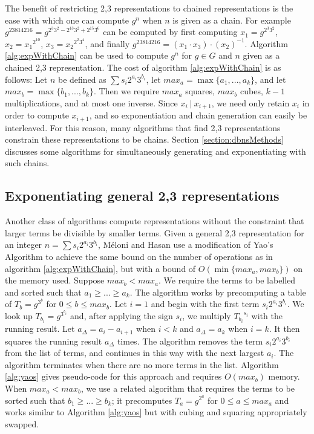 \documentclass{ucalgthes1}
\theoremstyle{definition}
\begin{document}
The benefit of restricting 2,3 representations to chained representations is the ease with which one can compute $g^n$ when $n$ is given as a chain.  For example $g^{23814216} = g^{2^3 3^2 - 2^{13} 3^2 + 2^{15} 3^6}$ can be computed by first computing $x_1 = g^{2^3 3^2}$, $x_2 = {x_1}^{2^{10}}$, $x_3 = {x_2}^{2^2 3^4}$, and finally $g^{23814216} = \left(x_1 \cdot x_3\right) \cdot \left(x_2\right)^{-1}$.  Algorithm \ref{alg:expWithChain} can be used to compute $g^n$ for $g \in G$ and $n$ given as a chained 2,3 representation.  The cost of algorithm \ref{alg:expWithChain} is as follows: Let $n$ be defined as $\sum s_i 2^{a_i} 3^{b_i}$, let $max_a = \max \{a_1,...,a_k\}$, and let $max_b = \max \{b_1,...,b_k\}$.  Then we require $max_a$ squares, $max_b$ cubes, $k-1$ multiplications, and at most one inverse.  Since $x_i ~|~ x_{i+1}$, we need only retain $x_i$ in order to compute $x_{i+1}$, and so exponentiation and chain generation can easily be interleaved. For this reason, many algorithms that find 2,3 representations constrain these representations to be chains.  Section \ref{section:dbnsMethods} discusses some algorithms for simultaneously generating and exponentiating with such chains.



\bigbreak
\subsection{Exponentiating general 2,3 representations}

Another class of algorithms compute representations without the constraint that larger terms be divisible by smaller terms.  Given a general 2,3 representation for an integer $n = \sum s_i 2^{a_i} 3^{b_i}$, M\'{e}loni and Hasan \cite[Section 3.2]{Meloni2009} use a modification of Yao's Algorithm to achieve the same bound on the number of operations as in algorithm \ref{alg:expWithChain}, but with a bound of $O(\min \{max_a, max_b\})$ on the memory used.  Suppose $max_b < max_a$.  We require the terms to be labelled and sorted such that $a_1 \ge ... \ge a_k$.  The algorithm works by precomputing a table of $T_b = g^{3^b}$ for $0 \le b \le max_b$.  Let $i=1$ and begin with the first term $s_i2^{a_i}3^{b_i}$.  We look up $T_{b_i} = g^{3^{b_i}}$ and, after applying the sign $s_i$, we multiply ${T_{b_i}}^{s_i}$ with the running result.  Let $a_\Delta = a_i - a_{i+1}$ when $i < k$ and $a_\Delta = a_k$ when $i = k$.  It then squares the running result $a_\Delta$ times.  The algorithm removes the term $s_i2^{a_i}3^{b_i}$ from the list of terms, and continues in this way with the next largest $a_i$.  The algorithm terminates when there are no more terms in the list.  Algorithm  \ref{alg:yaos} gives pseudo-code for this approach and requires $O(max_b)$ memory.  When $max_a < max_b$, we use a related algorithm that requires the terms to be sorted such that $b_1 \ge ... \ge b_k$; it precomputes $T_a = g^{2^a}$ for $0 \le a \le max_a$ and works similar to Algorithm \ref{alg:yaos} but with cubing and squaring appropriately swapped.
\end{document}
